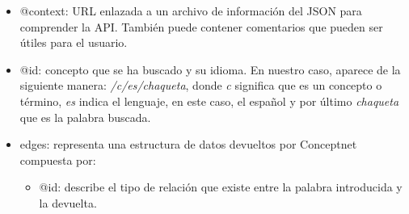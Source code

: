 \begin{itemize}
	\item @context: URL enlazada a un archivo de información del JSON para comprender la API. También puede contener comentarios que pueden ser útiles para el usuario.
	\item @id: concepto que se ha buscado y su idioma. En nuestro caso, aparece de la siguiente manera: \textit{/c/es/chaqueta}, donde  \textit{c} significa que es un concepto o término,  \textit{es} indica el lenguaje, en este caso, el español y por último \textit{chaqueta} que es la palabra buscada.
	\item edges: representa una estructura de datos devueltos por Conceptnet compuesta por:
	\begin{itemize}
		\item @id: describe el tipo de relación que existe entre la palabra introducida y la devuelta.
		

\end{itemize}
\end{itemize}
